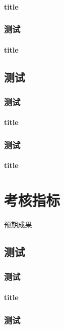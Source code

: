 \documentclass{fdu-doctorplan}
\begin{document}
\subsubsection{title}
\zhlipsum[1-3]

\subsection{测试}
\zhlipsum[1-3]
\subsubsection{title}
\zhlipsum[1-3]

\section{测试}
\zhlipsum[1-3]
\subsection{测试}
\zhlipsum[1-3]
\subsubsection{title}
\zhlipsum[1-3]

\subsection{测试}
\zhlipsum[1-3]
\subsubsection{title}
\zhlipsum[1-3]


\chapter{考核指标}
预期成果

\section{测试}
\zhlipsum[1-3]
\subsection{测试}
\zhlipsum[1-3]
\subsubsection{title}
\zhlipsum[1-3]

\subsection{测试}
\zhlipsum[1-3]
\end{document}
